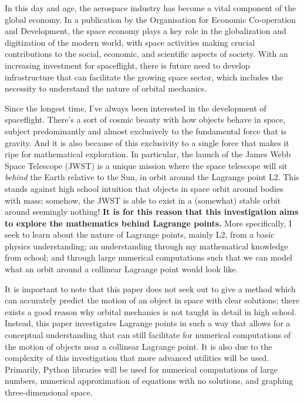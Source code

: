 In this day and age, the aerospace industry has become a vital component of the global economy.
In a publication by the Organisation for Economic Co-operation and Development, the space economy plays a key role in the globalization and digitization of the modern world, with space activities making crucial contributions to the social, economic, and scientific aspects of society\autocite{c5996201-en}.
With an increasing investment for spaceflight, there is future need to develop infrastructure that can facilitate the growing space sector, which includes the necessity to understand the nature of orbital mechanics.

Since the longest time, I've always been interested in the development of spaceflight.
There's a sort of cosmic beauty with how objects behave in space, subject predominantly and almost exclusively to the fundamental force that is gravity.
And it is also because of this exclusivity to a single force that makes it ripe for mathematical exploration.
In particular, the launch of the James Webb Space Telescope (JWST) is a unique mission where the space telescope will sit \textit{behind} the Earth relative to the Sun, in orbit around the Lagrange point L2.
This stands against high school intuition that objects in space orbit around bodies with mass; somehow, the JWST is able to exist in a (somewhat) stable orbit around seemingly nothing!
\textbf{It is for this reason that this investigation aims to explore the mathematics behind Lagrange points.}
More specifically, I seek to learn about the nature of Lagrange points, mainly L2, from a basic physics understanding; an understanding through my mathematical knowledge from school; and through large numerical computations such that we can model what an orbit around a collinear Lagrange point would look like.

It is important to note that this paper does not seek out to give a method which can accurately predict the motion of an object in space with clear solutions; there exists a good reason why orbital mechanics is not taught in detail in high school.
Instead, this paper investigates Lagrange points in such a way that allows for a conceptual understanding that can still facilitate for numerical computations of the motion of objects near a collinear Lagrange point.
It is also due to the complexity of this investigation that more advanced utilities will be used.
Primarily, Python libraries will be used for numerical computations of large numbers, numerical approximation of equations with no solutions, and graphing three-dimensional space.
